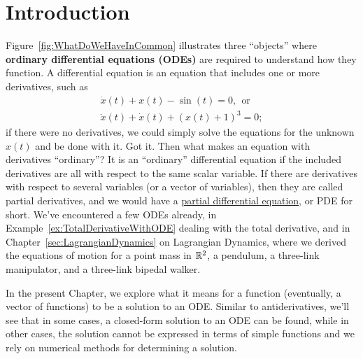 \section{Introduction}

Figure~\ref{fig:WhatDoWeHaveInCommon} illustrates three ``objects'' where \textbf{ordinary differential equations (ODEs)} are required to understand how they function. A differential equation is an equation that includes one or more derivatives, such as
$$
\begin{aligned}
    \dot{x}(t) + x(t) -\sin(t) = 0, ~~\text{or}\\
    \ddot{x}(t) + \dot{x}(t) + \left(x(t) +1 \right)^3 =0;
\end{aligned}
$$
if there were no derivatives, we could simply solve the equations for the unknown $x(t)$ and be done with it.
Got it. Then what makes an equation with derivatives ``ordinary''? It is an ``ordinary'' differential equation if the included derivatives are all with respect to the same scalar variable. If there are derivatives with respect to several variables (or a vector of variables), then they are called partial derivatives, and we would have a \href{https://youtu.be/ly4S0oi3Yz8}{partial differential equation}, or PDE for short. We've encountered a few ODEs already, in Example~\ref{ex:TotalDerivativeWithODE} dealing with the total derivative, and in Chapter~\ref{sec:LagrangianDynamics} on Lagrangian Dynamics, where we derived the equations of motion for a point mass in $\mathbb R^2$, a pendulum, a three-link manipulator, and a three-link bipedal walker. 

In the present Chapter, we explore what it means for a function (eventually, a vector of functions) to be a solution to an ODE. Similar to antiderivatives, we'll see that in some cases, a closed-form solution to an ODE can be found, while in other cases, the solution cannot be expressed in terms of simple functions and we rely on numerical methods for determining a solution.

\bigskip


